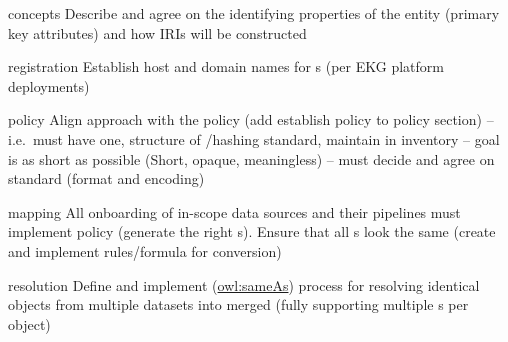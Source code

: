 \begin{members-only}

\kgmmscoringsection

\kgmmscoringlevelOne

\begin{scoring}

  \item [concepts] Describe and agree on the identifying properties of the entity (primary key
        attributes) and how IRIs will be constructed
  \item [registration] Establish host and domain names for s (per EKG platform deployments)
  \item [policy] Align approach with the  policy (add establish policy to policy section) --
        i.e.\ must have one, structure of /hashing standard, maintain in inventory --
        goal is as short as possible (Short, opaque, meaningless) --
        must decide and agree on standard (format and encoding)
  \item [mapping] All onboarding of in-scope data sources and their  pipelines must implement policy
        (generate the right s).
        Ensure that all s look the same (create and implement rules/formula for conversion)
  \item [resolution] Define and implement (\href{https://www.w3.org/TR/owl-ref/\#sameAs-def}{owl:sameAs}) process for
        resolving identical objects from multiple datasets into merged  (fully supporting
        multiple s per object)

\end{scoring}

\kgmmscoringlevelTwo

\begin{scoring}


\end{scoring}
\end{members-only}
